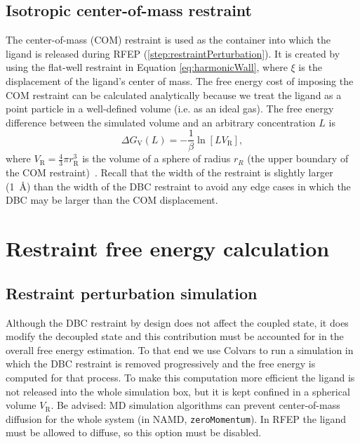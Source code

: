 \documentclass[9pt,tutorial,pubversion]{Styling/livecoms}
\newcommand{\textInput}[1]{\texttt{#1}}
\begin{document}
\subsection{Isotropic center-of-mass restraint} \label{app:COMCorrection}
The center-of-mass (COM) restraint is used as the container into which the ligand is released during RFEP (\ref{step:restraintPerturbation}). It is created by using the flat-well restraint in Equation \ref{eq:harmonicWall}, where $\xi$ is the displacement of the ligand's center of mass.
The free energy cost of imposing the COM restraint can be calculated analytically because we treat the ligand as a point particle in a well-defined volume (i.e. as an ideal gas).
The free energy difference between the simulated volume and an arbitrary concentration $L$ is
 \begin{equation}\label{eq:dGV}
     \Delta G_\mathrm{V}(L)=-\frac{1}{\beta} \ln [L V_\mathrm{R}],
 \end{equation}
where $V_\mathrm{R}=\frac{4}{3}\pi r_\mathrm{R}^{3}$ is the volume of a sphere of radius $r_R$ (the upper boundary of the COM restraint)~\cite{Salari2018}. 
Recall that the width of the restraint is slightly larger (1~\AA{}) than the width of the DBC restraint to avoid any edge cases in which the DBC may be larger than the COM displacement.

\section{Restraint free energy calculation}\label{app:RFEP}

\subsection{Restraint perturbation simulation}

Although the DBC restraint by design does not affect the coupled state, it does modify the decoupled state and this contribution must be accounted for in the overall free energy estimation. 
To that end we use Colvars to run a simulation in which the DBC restraint is removed progressively and the free energy is computed for that process.
To make this computation more efficient the ligand is not released into the whole simulation box, but it is kept confined in a spherical volume $V_\mathrm{R}$. 
Be advised: MD simulation algorithms can prevent center-of-mass diffusion for the whole system (in NAMD, \textInput{zeroMomentum}).
In RFEP the ligand must be allowed to diffuse, so this option must be disabled.
\end{document}

